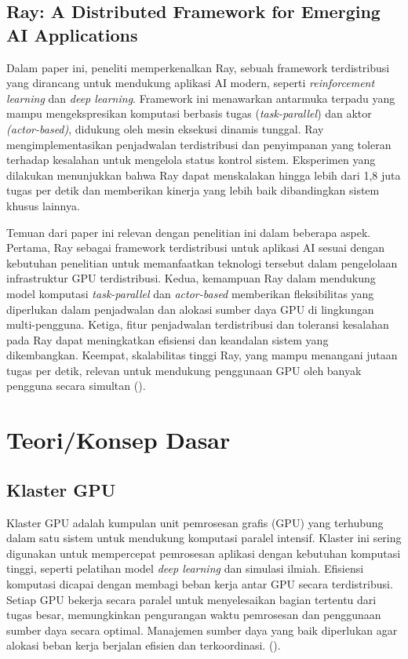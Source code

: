 \subsection{Ray: A Distributed Framework for Emerging AI Applications}

Dalam paper ini, peneliti memperkenalkan Ray, sebuah framework terdistribusi yang dirancang untuk mendukung aplikasi AI modern, seperti \emph{reinforcement learning} dan \emph{deep learning}. Framework ini menawarkan antarmuka terpadu yang mampu mengekspresikan komputasi berbasis tugas (\textit{task-parallel}) dan aktor \textit{(actor-based)}, didukung oleh mesin eksekusi dinamis tunggal. Ray mengimplementasikan penjadwalan terdistribusi dan penyimpanan yang toleran terhadap kesalahan untuk mengelola status kontrol sistem. Eksperimen yang dilakukan menunjukkan bahwa Ray dapat menskalakan hingga lebih dari 1,8 juta tugas per detik dan memberikan kinerja yang lebih baik dibandingkan sistem khusus lainnya.

Temuan dari paper ini relevan dengan penelitian ini dalam beberapa aspek. Pertama, Ray sebagai framework terdistribusi untuk aplikasi AI sesuai dengan kebutuhan penelitian untuk memanfaatkan teknologi tersebut dalam pengelolaan infrastruktur GPU terdistribusi. Kedua, kemampuan Ray dalam mendukung model komputasi\textit{ task-parallel} dan \textit{actor-based} memberikan fleksibilitas yang diperlukan dalam penjadwalan dan alokasi sumber daya GPU di lingkungan multi-pengguna. Ketiga, fitur penjadwalan terdistribusi dan toleransi kesalahan pada Ray dapat meningkatkan efisiensi dan keandalan sistem yang dikembangkan. Keempat, skalabilitas tinggi Ray, yang mampu menangani jutaan tugas per detik, relevan untuk mendukung penggunaan GPU oleh banyak pengguna secara simultan (\cite{moritz2018ray}).

\newpage

\section{Teori/Konsep Dasar}

\subsection{Klaster GPU}

Klaster GPU adalah kumpulan unit pemrosesan grafis (GPU) yang terhubung dalam satu sistem untuk mendukung komputasi paralel intensif. Klaster ini sering digunakan untuk mempercepat pemrosesan aplikasi dengan kebutuhan komputasi tinggi, seperti pelatihan model \textit{deep learning} dan simulasi ilmiah. Efisiensi komputasi dicapai dengan membagi beban kerja antar GPU secara terdistribusi. Setiap GPU bekerja secara paralel untuk menyelesaikan bagian tertentu dari tugas besar, memungkinkan pengurangan waktu pemrosesan dan penggunaan sumber daya secara optimal. Manajemen sumber daya yang baik diperlukan agar alokasi beban kerja berjalan efisien dan terkoordinasi. (\cite{wang2024distributedhpc}).

